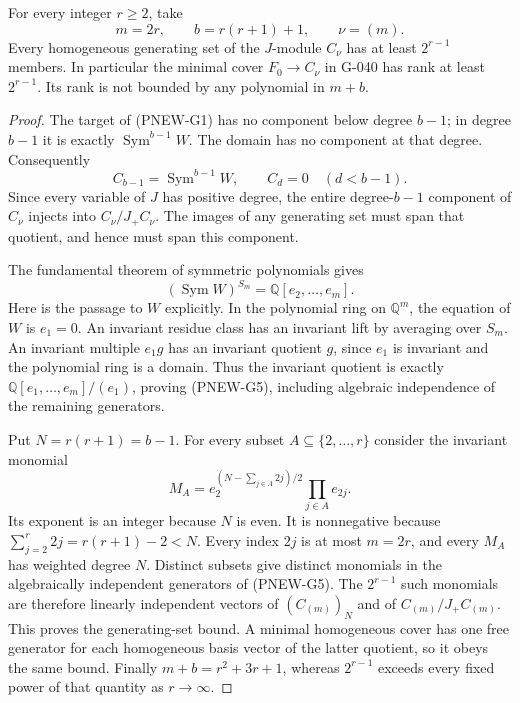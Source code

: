 \begin{proposition}
For every integer $r\ge2$, take
\[
 m=2r,\qquad b=r(r+1)+1,\qquad \nu=(m).
 \tag{PNEW-G3}
\]
Every homogeneous generating set of the $J$-module $C_\nu$ has
at least $2^{r-1}$ members.  In particular the minimal cover
$F_0\longrightarrow C_\nu$ in G-040 has rank at least $2^{r-1}$.
Its rank is not bounded by any polynomial in $m+b$.
\end{proposition}
\begin{proof}
The target of (PNEW-G1) has no component below degree $b-1$;
in degree $b-1$ it is exactly $\operatorname{Sym}^{b-1}W$.
The domain has no component at that degree.  Consequently
\[
 C_{b-1}=\operatorname{Sym}^{b-1}W,
 \qquad C_d=0\quad(d<b-1).
 \tag{PNEW-G4}
\]
Since every variable of $J$ has positive degree, the entire
degree-$b-1$ component of $C_\nu$ injects into
$C_\nu/J_+C_\nu$.  The images of any generating set must span
that quotient, and hence must span this component.

The fundamental theorem of symmetric polynomials gives
\[
 (\operatorname{Sym}W)^{S_m}=\mathbb Q[e_2,\ldots,e_m].
 \tag{PNEW-G5}
\]
Here is the passage to $W$ explicitly.  In the polynomial ring
on $\mathbb Q^m$, the equation of $W$ is $e_1=0$.
An invariant residue class has an invariant lift by averaging
over $S_m$.  An invariant multiple $e_1g$ has an invariant
quotient $g$, since $e_1$ is invariant and the polynomial ring
is a domain.  Thus the invariant quotient is exactly
$\mathbb Q[e_1,\ldots,e_m]/(e_1)$, proving (PNEW-G5), including
algebraic independence of the remaining generators.

Put $N=r(r+1)=b-1$.  For every subset
$A\subseteq\{2,\ldots,r\}$ consider the invariant monomial
\[
 M_A=e_2^{\left(N-\sum_{j\in A}2j\right)/2}
                 \prod_{j\in A}e_{2j}.
 \tag{PNEW-G6}
\]
Its exponent is an integer because $N$ is even.  It is
nonnegative because
$\sum_{j=2}^r2j=r(r+1)-2<N$.  Every index $2j$ is at most
$m=2r$, and every $M_A$ has weighted degree $N$.
Distinct subsets give distinct monomials in the algebraically
independent generators of (PNEW-G5).  The $2^{r-1}$ such
monomials are therefore linearly independent vectors of
$(C_{(m)})_N$ and of $C_{(m)}/J_+C_{(m)}$.
This proves the generating-set bound.  A minimal homogeneous
cover has one free generator for each homogeneous basis vector
of the latter quotient, so it obeys the same bound.
Finally $m+b=r^2+3r+1$, whereas $2^{r-1}$ exceeds every fixed
power of that quantity as $r\to\infty$.
\end{proof}

